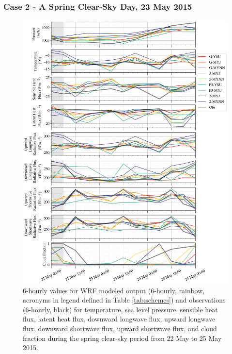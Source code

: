 \subsubsection{Case 2 - A Spring Clear-Sky Day, 23 May 2015}
\begin{figure}[p!]
    \centering \hspace*{-0.75cm}
    \includegraphics[width=1.1\linewidth]{figures/chapter3/wrf_case2.png}
    \caption[Polar WRF Case 3 - Spring clear-sky (23 May 2015) time series]{6-hourly values for WRF modeled output (6-hourly, rainbow, acronyms in legend defined in Table \ref{tab:schemes}) and observations (6-hourly, black) for temperature, sea level pressure, sensible heat flux, latent heat flux, downward longwave flux, upward longwave flux, downward shortwave flux, upward shortwave flux, and cloud fraction during the spring clear-sky period from 22 May to 25 May 2015.}
    \label{fig:wrf_case2}
\end{figure}

